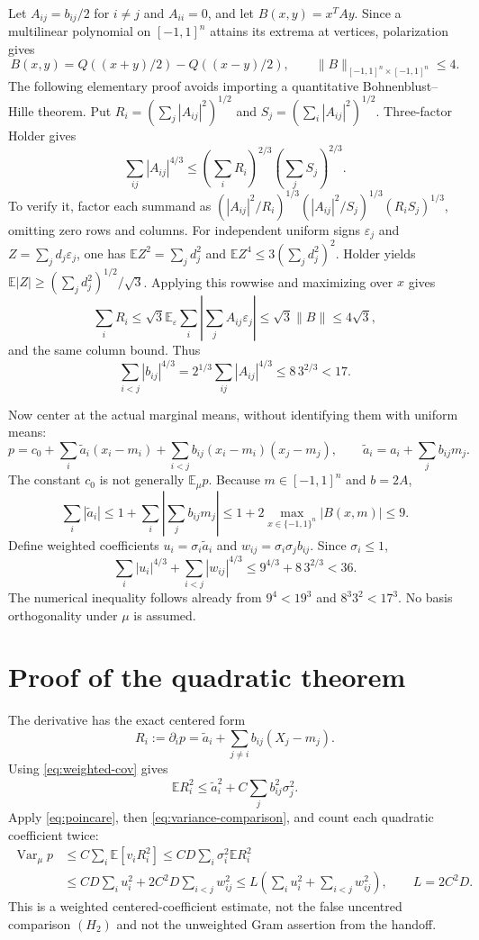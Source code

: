 \documentclass[11pt]{article}
\newcommand{\E}{\mathbb E}
\newcommand{\Var}{\operatorname{Var}}
\begin{document}
Let $A_{ij}=b_{ij}/2$ for $i\ne j$ and $A_{ii}=0$, and let
$B(x,y)=x^TAy$. Since a multilinear polynomial on $[-1,1]^n$
attains its extrema at vertices, polarization gives
\[
 B(x,y)=Q((x+y)/2)-Q((x-y)/2),\qquad
 \|B\|_{[-1,1]^n\times[-1,1]^n}\le4.
\]
The following elementary proof avoids importing a quantitative
Bohnenblust--Hille theorem. Put
$R_i=(\sum_j|A_{ij}|^2)^{1/2}$ and
$S_j=(\sum_i|A_{ij}|^2)^{1/2}$. Three-factor Holder gives
\[
 \sum_{ij}|A_{ij}|^{4/3}
 \le\left(\sum_iR_i\right)^{2/3}
       \left(\sum_jS_j\right)^{2/3}.
\]
To verify it, factor each summand as
$(|A_{ij}|^2/R_i)^{1/3}(|A_{ij}|^2/S_j)^{1/3}
(R_iS_j)^{1/3}$, omitting zero rows and columns.
For independent uniform signs $\varepsilon_j$ and
$Z=\sum_jd_j\varepsilon_j$, one has
$\E Z^2=\sum_jd_j^2$ and $\E Z^4\le3(\sum_jd_j^2)^2$.
Holder yields
$\E|Z|\ge(\sum_jd_j^2)^{1/2}/\sqrt3$.
Applying this rowwise and maximizing over $x$ gives
\[
 \sum_iR_i\le\sqrt3\E_\varepsilon\sum_i
       |\sum_jA_{ij}\varepsilon_j|\le\sqrt3\|B\|\le4\sqrt3,
\]
and the same column bound. Thus
\begin{equation}
 \sum_{i<j}|b_{ij}|^{4/3}
   =2^{1/3}\sum_{ij}|A_{ij}|^{4/3}
   \le 8\,3^{2/3}<17.
 \label{eq:quadratic-coeff}
\end{equation}

Now center at the actual marginal means, without identifying them
with uniform means:
\[
 p=c_0+\sum_i\widetilde a_i(x_i-m_i)
          +\sum_{i<j}b_{ij}(x_i-m_i)(x_j-m_j),\qquad
 \widetilde a_i=a_i+\sum_jb_{ij}m_j.
\]
The constant $c_0$ is not generally $\E_\mu p$.
Because $m\in[-1,1]^n$ and $b=2A$,
\[
 \sum_i|\widetilde a_i|
 \le1+\sum_i|\sum_jb_{ij}m_j|
 \le1+2\max_{x\in\{-1,1\}^n}|B(x,m)|\le9.
\]
Define weighted coefficients
$u_i=\sigma_i\widetilde a_i$ and
$w_{ij}=\sigma_i\sigma_jb_{ij}$. Since $\sigma_i\le1$,
\begin{equation}
 \sum_i|u_i|^{4/3}+\sum_{i<j}|w_{ij}|^{4/3}
 \le9^{4/3}+8\,3^{2/3}<36.
 \label{eq:weighted-coeff}
\end{equation}
The numerical inequality follows already from $9^4<19^3$ and
$8^3 3^2<17^3$. No basis orthogonality under $\mu$ is assumed.

\section{Proof of the quadratic theorem}

The derivative has the exact centered form
\[
 R_i:=\partial_i p=\widetilde a_i+
                      \sum_{j\ne i}b_{ij}(X_j-m_j).
\]
Using \eqref{eq:weighted-cov} gives
\[
 \E R_i^2\le\widetilde a_i^2+C\sum_jb_{ij}^2\sigma_j^2.
\]
Apply \eqref{eq:poincare}, then \eqref{eq:variance-comparison},
and count each quadratic coefficient twice:
\begin{align}
 \Var_\mu p
 &\le C\sum_i\E[v_iR_i^2]
 \le CD\sum_i\sigma_i^2\E R_i^2\nonumber\\
 &\le CD\sum_i u_i^2+2C^2D\sum_{i<j}w_{ij}^2
 \le L\left(\sum_i u_i^2+\sum_{i<j}w_{ij}^2\right),
 \qquad L=2C^2D.\label{eq:weighted-gram}
\end{align}
This is a weighted centered-coefficient estimate, not the false
uncentred comparison $(H_2)$ and not the unweighted Gram assertion
from the handoff.
\end{document}
